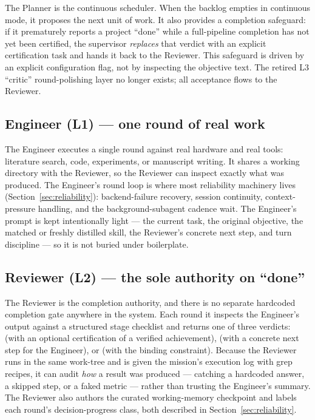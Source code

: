 The Planner is the continuous scheduler. When the backlog empties in continuous
mode, it proposes the next unit of work. It also provides a completion
safeguard: if it prematurely reports a project ``done'' while a full-pipeline
completion has not yet been certified, the supervisor \emph{replaces} that verdict
with an explicit  certification task and hands it
back to the Reviewer. This safeguard is driven by an explicit configuration flag,
not by inspecting the objective text. The retired L3 ``critic'' round-polishing
layer no longer exists; all acceptance flows to the Reviewer.

\subsection{Engineer (L1) --- one round of real work}

The Engineer executes a single round against real hardware and real tools:
literature search, code, experiments, or manuscript writing. It shares a working
directory with the Reviewer, so the Reviewer can inspect exactly what was
produced. The Engineer's round loop is where most reliability machinery lives
(Section~\ref{sec:reliability}): backend-failure recovery, session continuity,
context-pressure handling, and the background-subagent cadence wait. The
Engineer's prompt is kept intentionally light --- the current task, the original
objective, the matched or freshly distilled skill, the Reviewer's concrete next
step, and turn discipline --- so it is not buried under boilerplate.

\subsection{Reviewer (L2) --- the sole authority on ``done''}

The Reviewer is the completion authority, and there is no separate hardcoded
completion gate anywhere in the system. Each round it inspects the Engineer's
output against a structured stage checklist and returns one of three verdicts:
 (with an optional certification of a verified achievement),
 (with a concrete next step for the Engineer), or 
(with the binding constraint). Because the Reviewer runs in the same work-tree
and is given the mission's execution log with grep recipes, it can audit
\emph{how} a result was produced --- catching a hardcoded answer, a skipped step,
or a faked metric --- rather than trusting the Engineer's summary. The Reviewer
also authors the curated working-memory checkpoint and labels each round's
decision-progress class, both described in Section~\ref{sec:reliability}.

